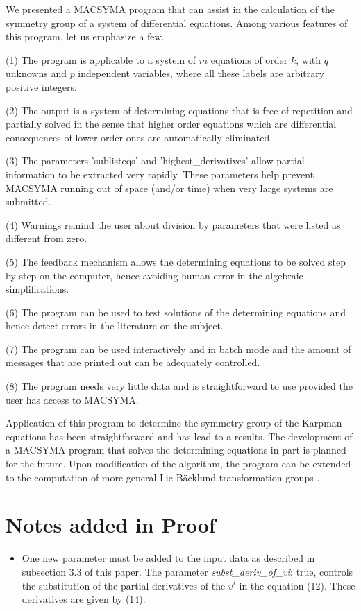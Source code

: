 {We presented a MACSYMA program that can assist in the calculation of the
symmetry group of a system of differential equations. Among various features
of this program, let us emphasize a few.\par
\noindent
(1) The program is applicable to a system of $m$ equations of order $k$, with
$q$ unknowns and $p$ independent variables, where all these labels are
arbitrary positive integers. \par
\noindent
(2) The output is a system of determining equations that is free 
of repetition and partially solved in the sense that higher order equations 
which are differential consequences of lower order ones are automatically 
eliminated. \par
\noindent
(3) The parameters 'sublisteqs' and 'highest\_derivatives' allow
partial information to be extracted very rapidly. 
These parameters help prevent MACSYMA
running out of space (and/or time) when very large systems 
are submitted. \par
\noindent
(4) Warnings remind the user about
division by parameters that were listed as different from  zero. \par
\noindent
(5) The feedback mechanism allows the determining equations 
to be solved step
by step on the computer, hence avoiding human error in the algebraic 
simplifications. \par
\noindent
(6) The program can be used to test solutions of the determining equations 
and hence detect errors in the literature on the subject. \par
\noindent
(7) The program can be used interactively and in batch mode and the
amount of messages that are printed out can be adequately controlled. \par
\noindent
(8) The program needs very little data and is straightforward to use
provided the user has access to MACSYMA. \par
\noindent
Application of this program to determine the symmetry group of the
Karpman equations has been straightforward and has lead to a results.
The development of a MACSYMA program that solves the determining
equations in part is planned for the future. 
Upon modification of the algorithm, the
program can be extended to the computation of more general 
Lie-B\"{a}cklund transformation groups \cite{andersonibragimovbook}.

\vskip 2pt
\section*{Notes added in Proof}
\vskip 2pt
\begin{itemize}
\item One new parameter must be added to the input data as described in 
subsection 3.3 of this paper.
The parameter {\em subst\_deriv\_of\_vi}: true, controls the 
substitution of the partial derivatives of the $v^i$ in the equation (12). 
These derivatives are given by (14).


\end{itemize}}
